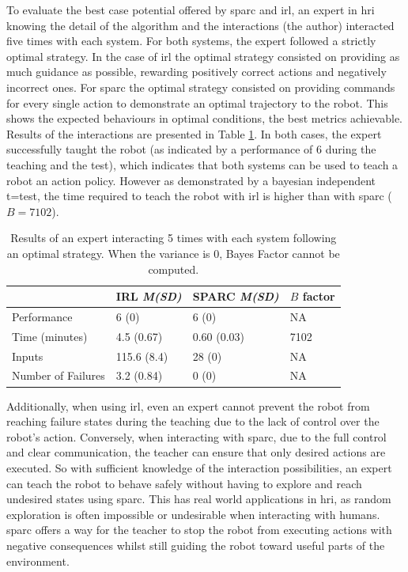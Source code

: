To evaluate the best case potential offered by \gls{sparc} and \gls{irl}, an expert in \gls{hri} knowing the detail of the algorithm and the interactions (the author) interacted five times with each system. For both systems, the expert followed a strictly optimal strategy. In the case of \gls{irl} the optimal strategy consisted on providing as much guidance as possible, rewarding positively correct actions and negatively incorrect ones. For \gls{sparc} the optimal strategy consisted on providing commands for every single action to demonstrate an optimal trajectory to the robot. This shows the expected behaviours in optimal conditions, the best metrics achievable. Results of the interactions are presented in Table \ref{tab:control_expert}. In both cases, the expert successfully taught the robot (as indicated by a performance of 6 during the teaching and the test), which indicates that both systems can be used to teach a robot an action policy. However as demonstrated by a bayesian independent t=test, the time required to teach the robot with \gls{irl} is higher than with \gls{sparc} ($B=7102$). 

\begin{table}[ht]
	\centering
	\caption{Results of an expert interacting 5 times with each system following an optimal strategy. When the variance is 0, Bayes Factor cannot be computed.}
	\label{tab:control_expert}
	\begin{tabular}{@{}llll@{}}\toprule
		&IRL \textit{M(SD)} & SPARC \textit{M(SD)} & $B$ factor\\
		\midrule
		Performance & 6 (0) & 6 (0) & NA \\
		Time (minutes) & 4.5 (0.67) & 0.60 (0.03) & 7102 \\
		Inputs & 115.6 (8.4) & 28 (0) & NA \\
		Number of Failures & 3.2 (0.84) & 0 (0) & NA \\
		\bottomrule
	\end{tabular}
\end{table}

Additionally, when using \gls{irl}, even an expert cannot prevent the robot from reaching failure states during the teaching due to the lack of control over the robot's action. Conversely, when interacting with \gls{sparc}, due to the full control and clear communication, the teacher can ensure that only desired actions are executed. So with sufficient knowledge of the interaction possibilities, an expert can teach the robot to behave safely without having to explore and reach undesired states using \gls{sparc}. This has real world applications in \gls{hri}, as random exploration is often impossible or undesirable when interacting with humans. \gls{sparc} offers a way for the teacher to stop the robot from executing actions with negative consequences whilst still guiding the robot toward useful parts of the environment.

